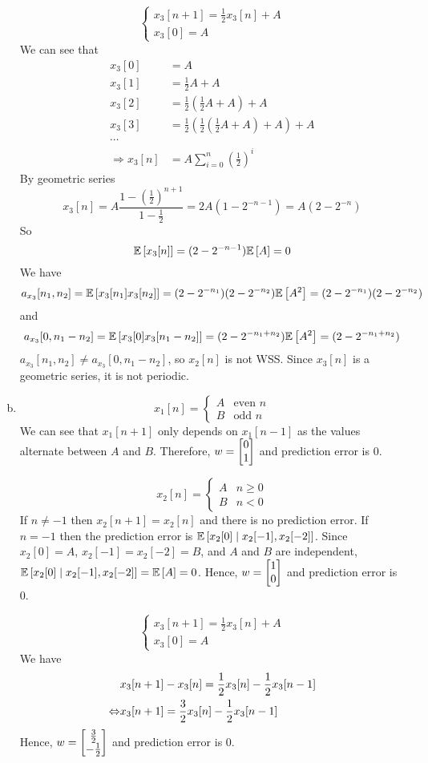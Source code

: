 \begin{enumerate}[(a)]
\[\begin{cases}x_3[n+1] = \frac{1}{2}x_3[n] + A \\ x_3[0] = A \end{cases}\]
We can see that
\begin{align*}
	x_3[0] &= A \\
	x_3[1] &= \frac{1}{2}A + A \\
	x_3[2] &= \frac{1}{2}\left(\frac{1}{2}A + A\right) + A \\
	x_3[3] &= \frac{1}{2}\left(\frac{1}{2}\left(\frac{1}{2}A + A\right) + A\right) + A \\
	\cdots\\
	\Rightarrow x_3[n] &= A \sum_{i=0}^{n}\left(\frac{1}{2}\right)^i
\end{align*}
By geometric series
\[x_3[n] = A \frac{1-\left(\frac{1}{2}\right)^{n+1}}{1 - \frac{1}{2}} = 2A(1 - 2^{-n-1}) = A(2 - 2^{-n})\]
So
\[\mathbb{E} \left[ x_3[n] \right] = (2-2^{-n-1}) \mathbb{E} \left[ A \right] = 0\]
We have
\[a_{x_3}[n_1,n_2] = \mathbb{E} \left[ x_3[n_1]x_3[n_2] \right] = (2-2^{-n_1})(2-2^{-n_2})\mathbb{E} \left[ A^2 \right] = (2-2^{-n_1})(2-2^{-n_2})\]
and
\[a_{x_3}[0,n_1-n_2] = \mathbb{E} \left[ x_3[0]x_3[n_1-n_2] \right] = (2-2^{-n_1+n_2})\mathbb{E} \left[ A^2 \right] = (2-2^{-n_1+n_2})\]
$a_{x_3}[n_1,n_2] \neq a_{x_3}[0,n_1-n_2]$, so $x_2[n]$ is not WSS. Since $x_3[n]$ is a geometric series, it is not periodic.

\item
\[x_1[n] = \begin{cases}A & \text{even } n \\ B & \text{odd } n \end{cases}\]
We can see that $x_1[n+1]$ only depends on $x_1[n-1]$ as the values alternate between $A$ and $B$. Therefore, $w = \begin{bmatrix} 0\\1 \end{bmatrix}$ and prediction error is 0.

\[x_2[n] = \begin{cases}A & n \geq 0 \\ B & n < 0 \end{cases}\]
If $n \neq -1$ then $x_2[n+1] = x_2[n]$ and there is no prediction error. If $n = -1$ then the prediction error is $\mathbb{E} \left[ x_2[0] \mid x_2[-1], x_2[-2] \right]$. Since $x_2[0] = A$, $x_2[-1] = x_2[-2] = B$, and $A$ and $B$ are independent, $\mathbb{E} \left[ x_2[0] \mid x_2[-1], x_2[-2] \right] = \mathbb{E} \left[ A \right] = 0$. Hence, $w = \begin{bmatrix} 1\\0 \end{bmatrix}$ and prediction error is 0.

\[\begin{cases}x_3[n+1] = \frac{1}{2}x_3[n] + A \\ x_3[0] = A \end{cases}\]
We have
\begin{align*}
	&x_3[n+1] - x_3[n] = \frac{1}{2} x_3[n] - \frac{1}{2} x_3[n-1]\\
	\Leftrightarrow & x_3[n+1] = \frac{3}{2} x_3[n] - \frac{1}{2} x_3[n-1]
\end{align*}
Hence, $w = \begin{bmatrix} \frac{3}{2} \\ -\frac{1}{2} \end{bmatrix}$ and prediction error is 0.
\end{enumerate}